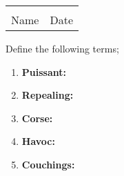 \documentclass[12pt]{article} %
\begin{document}
  \vspace*{0.4cm}

	\begin{center}
	\noindent\begin{tabular}{ll}
		\makebox[3in]{\hrulefill} & \makebox[3in]{\hrulefill}\\
		Name & Date\\[8ex]%
	\end{tabular}
	\end{center}
	\newpage

    \begin{qstn}
      Define the following terms;
      \begin{enumerate}[label=(\alph*)]
        \item \textbf{Puissant:} 
          \vspace*{1cm}
        \item \textbf{Repealing:}
          \vspace*{1cm}
        \item \textbf{Corse:}
          \vspace*{1cm}
        \item \textbf{Havoc:}
          \vspace*{1cm}
        \item \textbf{Couchings:}
          \vspace*{1cm}
      \end{enumerate}
    \end{qstn}
\end{document}

